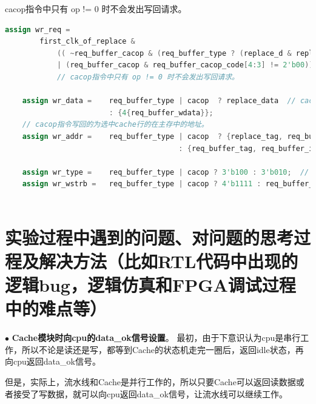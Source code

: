 \documentclass[11pt]{article}
\begin{document}
\begin{enumerate}
\begin{enumerate}
        cacop指令中只有 op != 0 时不会发出写回请求。

\begin{lstlisting}[language=verilog]
    assign wr_req =     
        first_clk_of_replace & 
            (( ~req_buffer_cacop & (req_buffer_type ? (replace_d & replace_v) : req_buffer_op)) // 非cacop的情况
            | (req_buffer_cacop & req_buffer_cacop_code[4:3] != 2'b00)); 
            // cacop指令中只有 op != 0 时不会发出写回请求。

    assign wr_data =    req_buffer_type | cacop  ? replace_data  // cacop指令写回命中(指定)行数据
                        : {4{req_buffer_wdata}};
    // cacop指令写回的为选中cache行的在主存中的地址。
    assign wr_addr =    req_buffer_type | cacop  ? {replace_tag, req_buffer_index, 4'b0} 
                                        : {req_buffer_tag, req_buffer_index, req_buffer_offset};
   
    assign wr_type =    req_buffer_type | cacop ? 3'b100 : 3'b010;  // cacop指令写回整个行
    assign wr_wstrb =   req_buffer_type | cacop ? 4'b1111 : req_buffer_wstrb;// cacop指令写回所有字节
    

\end{lstlisting}
    \end{enumerate}

\end{enumerate}

























\section{实验过程中遇到的问题、对问题的思考过程及解决方法（比如RTL代码中出现的逻辑bug，逻辑仿真和FPGA调试过程中的难点等）}

\noindent
$\bullet$
\textbf{Cache模块时向cpu的data\_ok信号设置}。
最初，由于下意识认为cpu是串行工作，所以不论是读还是写，都等到Cache的状态机走完一圈后，返回idle状态，再向cpu返回data\_ok信号。

但是，实际上，流水线和Cache是并行工作的，所以只要Cache可以返回读数据或者接受了写数据，就可以向cpu返回data\_ok信号，让流水线可以继续工作。
\end{document}
